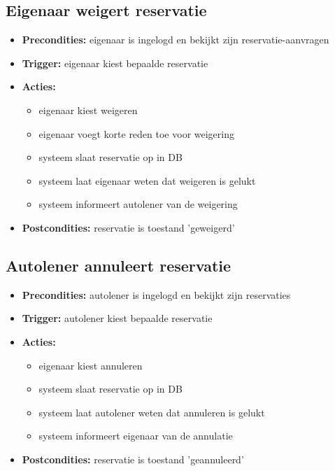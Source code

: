 \documentclass[11pt,a4paper,oneside]{article}
\begin{document}
\subsection{Eigenaar weigert reservatie}
\begin{itemize}
\item \textbf{Precondities:} eigenaar is ingelogd en bekijkt zijn reservatie-aanvragen \item \textbf{Trigger:} eigenaar kiest bepaalde reservatie
\item \textbf{Acties:} \begin{itemize}
\item	eigenaar kiest weigeren
\item	eigenaar voegt korte reden toe voor weigering
\item	systeem slaat reservatie op in DB
\item      systeem laat eigenaar weten dat weigeren is gelukt
\item      systeem informeert autolener van de weigering
\end{itemize}
\item \textbf{Postcondities:} reservatie is toestand 'geweigerd'
\end{itemize}

\subsection{Autolener annuleert reservatie}
\begin{itemize}
\item \textbf{Precondities:} autolener is ingelogd en bekijkt zijn reservaties \item \textbf{Trigger:} autolener kiest bepaalde reservatie
\item \textbf{Acties:} \begin{itemize}
\item	eigenaar kiest annuleren
\item	systeem slaat reservatie op in DB
\item      systeem laat autolener weten dat annuleren is gelukt
\item      systeem informeert eigenaar van de annulatie
\end{itemize}
\item \textbf{Postcondities:} reservatie is toestand 'geannuleerd'
\end{itemize}
\end{document}
